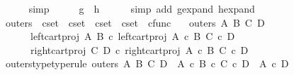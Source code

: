 \begin{isabellebody}
\ \ \ \ \isamarkupfalse%
\ simp\isanewline
\ \ \isamarkupfalse%
\ \isamarkupfalse%
\ {\isachardoublequoteopen}g\ {\isacharequal}{\kern0pt}\ h{\isachardoublequoteclose}\isanewline
\ \ \ \ \isamarkupfalse%
\ {\isacharparenleft}{\kern0pt}simp\ add{\isacharcolon}{\kern0pt}\ g{\isacharunderscore}{\kern0pt}expand\ h{\isacharunderscore}{\kern0pt}expand{\isacharparenright}{\kern0pt}\isanewline
{}\isamarkupfalse%
%
\endisatagproof
{\isafoldproof}%
%
\isadelimproof
%
\endisadelimproof
%
\isadelimdocument
%
\endisadelimdocument
%
\isatagdocument
%
\isamarkuptrue%
%
\endisatagdocument
{\isafolddocument}%
%
\isadelimdocument
%
\endisadelimdocument
{}\isamarkupfalse%
\ outers\ {\isacharcolon}{\kern0pt}{\isacharcolon}{\kern0pt}\ {\isachardoublequoteopen}cset\ {\isasymRightarrow}\ cset\ {\isasymRightarrow}\ cset\ {\isasymRightarrow}\ cset\ {\isasymRightarrow}\ cfunc{\isachardoublequoteclose}\ \isanewline
\ \ {\isachardoublequoteopen}outers\ A\ B\ C\ D\ {\isacharequal}{\kern0pt}\ {\isasymlangle}\isanewline
\ \ \ \ \ \ left{\isacharunderscore}{\kern0pt}cart{\isacharunderscore}{\kern0pt}proj\ A\ B\ {\isasymcirc}\isactrlsub c\ left{\isacharunderscore}{\kern0pt}cart{\isacharunderscore}{\kern0pt}proj\ {\isacharparenleft}{\kern0pt}A\ {\isasymtimes}\isactrlsub c\ B{\isacharparenright}{\kern0pt}\ {\isacharparenleft}{\kern0pt}C\ {\isasymtimes}\isactrlsub c\ D{\isacharparenright}{\kern0pt}{\isacharcomma}{\kern0pt}\isanewline
\ \ \ \ \ \ right{\isacharunderscore}{\kern0pt}cart{\isacharunderscore}{\kern0pt}proj\ C\ D\ {\isasymcirc}\isactrlsub c\ right{\isacharunderscore}{\kern0pt}cart{\isacharunderscore}{\kern0pt}proj\ {\isacharparenleft}{\kern0pt}A\ {\isasymtimes}\isactrlsub c\ B{\isacharparenright}{\kern0pt}\ {\isacharparenleft}{\kern0pt}C\ {\isasymtimes}\isactrlsub c\ D{\isacharparenright}{\kern0pt}\isanewline
\ \ \ \ {\isasymrangle}{\isachardoublequoteclose}\isanewline
\isanewline
{}\isamarkupfalse%
\ outers{\isacharunderscore}{\kern0pt}type{\isacharbrackleft}{\kern0pt}type{\isacharunderscore}{\kern0pt}rule{\isacharbrackright}{\kern0pt}{\isacharcolon}{\kern0pt}\ {\isachardoublequoteopen}outers\ A\ B\ C\ D\ {\isacharcolon}{\kern0pt}\ {\isacharparenleft}{\kern0pt}A\ {\isasymtimes}\isactrlsub c\ B{\isacharparenright}{\kern0pt}\ {\isasymtimes}\isactrlsub c\ {\isacharparenleft}{\kern0pt}C\ {\isasymtimes}\isactrlsub c\ D{\isacharparenright}{\kern0pt}\ {\isasymrightarrow}\ {\isacharparenleft}{\kern0pt}A\ {\isasymtimes}\isactrlsub c\ D{\isacharparenright}{\kern0pt}{\isachardoublequoteclose}\isanewline

\end{isabellebody}
